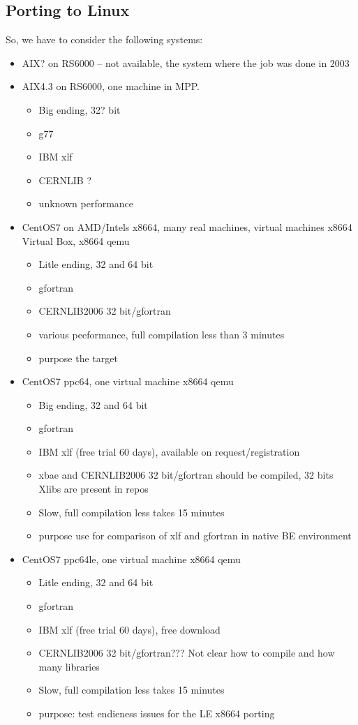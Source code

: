 \documentclass[a4paper,10pt]{article}
\begin{document}
\subsection{Porting to Linux}

So, we have to consider the following systems:
\begin{itemize}
\item AIX? on RS6000  -- not available, the system where the job was done in 2003
\item {
AIX4.3 on RS6000, one machine in MPP. 
\begin{itemize}
\item Big ending, 32? bit
\item g77
\item IBM xlf
\item CERNLIB ?
\item unknown performance 
\end{itemize}
}
\item {
CentOS7 on AMD/Intels x8664, many  real machines, virtual machines  x8664 Virtual Box, x8664 qemu
\begin{itemize}
\item Litle ending, 32 and 64 bit
\item gfortran
\item CERNLIB2006 32 bit/gfortran
\item various peeformance, full compilation less than 3 minutes
\item purpose the target 
\end{itemize}
}

\item {
CentOS7 ppc64, one  virtual machine x8664 qemu
\begin{itemize}
\item Big ending, 32 and 64 bit
\item gfortran
\item IBM xlf (free trial 60 days), available on request/registration
\item xbae  and  CERNLIB2006 32 bit/gfortran should be compiled, 32 bits Xlibs are present in repos
\item Slow, full compilation less takes 15 minutes
\item purpose use for comparison of xlf and gfortran in native BE  environment 
\end{itemize}
}

\item {
CentOS7 ppc64le, one  virtual machine x8664 qemu
\begin{itemize}
\item Litle ending, 32 and 64 bit
\item gfortran
\item IBM xlf  (free trial 60 days), free download
\item CERNLIB2006 32 bit/gfortran??? Not clear how to compile and how many libraries
\item Slow, full compilation less takes 15 minutes
\item purpose: test endieness issues for the LE x8664 porting


\end{itemize}}
\end{itemize}
\end{document}
